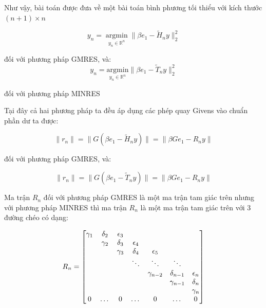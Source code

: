 \documentclass[14pt, a4paper]{article}
\numberwithin{equation}{section}
\numberwithin{algorithm}{section}
\numberwithin{figure}{section}
\numberwithin{dl}{section}
\numberwithin{md}{section}
\numberwithin{bd}{section}
\numberwithin{dn}{section}
\numberwithin{hq}{section}
\begin{document}
Như vậy, bài toán được đưa về một bài toán bình phương tối thiểu với kích thước $(n+1)\times n$

\begin{equation}
    y_n = \operatorname*{argmin}_{y_n \in \mathbb{R}^{n}} \lVert \beta e_1 - \widetilde{H}_n y\rVert_2^2
\end{equation}

đối với phương pháp GMRES, và:
\begin{equation}
    y_n = \underset{y_n \in \mathbb{R}^{n}}{\mathrm{argmin}} \lVert \beta e_1 - \widetilde{T}_n y\rVert_2^2
\end{equation}

đối với phương pháp MINRES

Tại đây cả hai phương pháp ta đều áp dụng các phép quay Givens vào chuẩn phần dư ta được:

\begin{equation}
    \lVert r_n \rVert = \lVert G(\beta e_1 - \widetilde{H}_n y) \rVert = \lVert \beta G e_1 - R_n y \rVert
\end{equation}

đối với phương pháp GMRES, và:

\begin{equation}
    \lVert r_n \rVert = \lVert G(\beta e_1 - \widetilde{T}_n y) \rVert = \lVert \beta G e_1 - R_n y \rVert
\end{equation}

Ma trận $R_n$ đối với phương pháp GMRES là một ma trận tam giác trên nhưng với phương pháp MINRES thì ma trận $R_n$ là một ma trận tam giác trên với 3 đường chéo có dạng:

\begin{equation}
    R_n = \begin{bmatrix}
        \gamma_1 & \delta_2 & \epsilon_3 & \space & \space & \space & \space \\
        \space & \gamma_2 & \delta_3 & \epsilon_4 & \space & \space & \space \\
        \space & \space  & \gamma_3 & \delta_4 & \epsilon_5 & \space & \space \\
        \space & \space & \space & \ddots & \ddots & \ddots & \space \\
        \space & \space & \space & \space & \gamma_{n-2} & \delta_{n-1} & \epsilon_n \\
        \space & \space & \space & \space & \space & \gamma_{n-1} & \delta_n \\
        \space & \space & \space & \space & \space & \space & \gamma_n \\
        0 & \dots & 0 & \dots & 0 & \dots & 0
    \end{bmatrix}
\end{equation}
\end{document}
